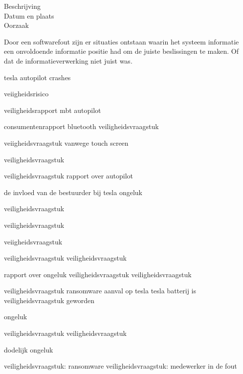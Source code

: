 	\begin{description}
	\item[Beschrijving]
	\item[Datum en plaats] 
	\item[Oorzaak]
\end{description}
Door een softwarefout zijn er situaties ontstaan waarin het systeem informatie een onvoldoende informatie positie had om de juiste beslissingen te maken. Of dat de informatieverwerking niet juist was.

 
tesla autopilot crashes


veiigheidsrisico

\cite{evan01042019teslaautopilotIntersection}

\cite{testVehicleSafetyReport}
veiligheidsrapport mbt autopilot

\cite{lambert31062020q2safetyreport}
consumentenrapport
bluetooth veiligheidsvraagstuk

\cite{wiredBloutoothHackTesla}
veiigheidsvraagstuk vanwege touch screen

\cite{preston14012021NHTSATeslaRecall}
veiligheidsvraagstuk

\cite{cio25112020belgianTeslaHack}
veiligheidsvraagstuk
rapport over autopilot

\cite{templeton06092019HTSBReportTesla}
de invloed van de bestuurder bij tesla ongeluk

veiligheidsvraagstuk

\cite{darkReading17112020TeslaBackup}
veiligheidsvraagstuk

\cite{leyden23032020TeslaInterfaceHack}
veiigheidsvraagstuk

\cite{huddlestonjr03042019ChineseTeslaHack}
veiligheidsvraagstuk
veiligheidsvraagstuk

\cite{heilweil26022020teslaAutopilot}
rapport over ongeluk
veiligheidsvraagstuk
veiligheidsvraagstuk

\cite{blanco04102019NHTSATesla}
veiligheidsvraagstuk
ransomware aanval op tesla
tesla batterij is veiligheidsvraagstuk geworden

\cite{mitchell01072020teslabatterycooling}
ongeluk

\cite{bbc26022020AutopilotCrash}
veiligheidsvraagstuk
veiligheidsvraagstuk

\cite{stumpff04052020TeslaPersonalData}
dodelijk ongeluk

\cite{levin08062018teslaautopilotsafety}
veiligheidsvraagstuk: ransomware
veiligheidsvraagstuk: medewerker in de fout

